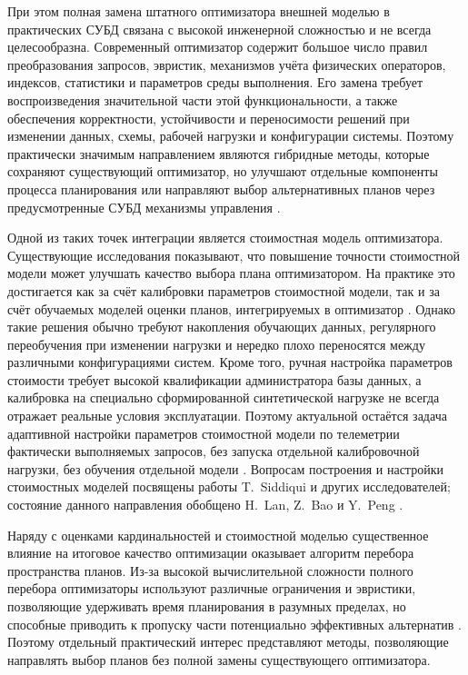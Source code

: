При этом полная замена штатного оптимизатора внешней моделью в практических СУБД связана с высокой инженерной сложностью и не всегда целесообразна. Современный оптимизатор содержит большое число правил преобразования запросов, эвристик, механизмов учёта физических операторов, индексов, статистики и параметров среды выполнения. Его замена требует воспроизведения значительной части этой функциональности, а также обеспечения корректности, устойчивости и переносимости решений при изменении данных, схемы, рабочей нагрузки и конфигурации системы. Поэтому практически значимым направлением являются гибридные методы, которые сохраняют существующий оптимизатор, но улучшают отдельные компоненты процесса планирования или направляют выбор альтернативных планов через предусмотренные СУБД механизмы управления \cite{zhu2023lero, anneser2023autosteer}.




Одной из таких точек интеграции является стоимостная модель оптимизатора. Существующие исследования показывают, что повышение точности стоимостной модели может улучшать качество выбора плана оптимизатором. На практике это достигается как за счёт калибровки параметров стоимостной модели, так и за счёт обучаемых моделей оценки планов, интегрируемых в оптимизатор \cite{Lan_2021}. Однако такие решения обычно требуют накопления обучающих данных, регулярного переобучения при изменении нагрузки и нередко плохо переносятся между различными конфигурациями систем. Кроме того, ручная настройка параметров стоимости требует высокой квалификации администратора базы данных, а калибровка на специально сформированной синтетической нагрузке не всегда отражает реальные условия эксплуатации. Поэтому актуальной остаётся задача адаптивной настройки параметров стоимостной модели по телеметрии фактически выполняемых запросов, без запуска отдельной калибровочной нагрузки, без обучения отдельной модели \cite{10.1145/3514221.3526154, 10.1145/3318464.3380584}. Вопросам построения и настройки стоимостных моделей посвящены работы T.~Siddiqui и других исследователей; состояние данного направления обобщено H.~Lan, Z.~Bao и Y.~Peng \cite{10.1145/3318464.3380584,Lan_2021}.

Наряду с оценками кардинальностей и стоимостной моделью существенное влияние на итоговое качество оптимизации оказывает алгоритм перебора пространства планов. Из-за высокой вычислительной сложности полного перебора оптимизаторы используют различные ограничения и эвристики, позволяющие удерживать время планирования в разумных пределах, но способные приводить к пропуску части потенциально эффективных альтернатив \cite{Lan_2021}. Поэтому отдельный практический интерес представляют методы, позволяющие направлять выбор планов без полной замены существующего оптимизатора. 

